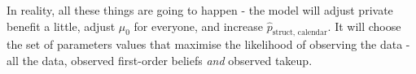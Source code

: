 \documentclass{article}
\begin{document}
In reality, all these things are going to happen - the model will adjust private benefit a little, adjust $\mu_0$ for 
everyone, and increase $\hat{p}_\text{struct, calendar}$. It will choose the set of parameters values that 
maximise the likelihood of observing the data - all the data, observed first-order 
beliefs \emph{and} observed takeup.
\end{document}
